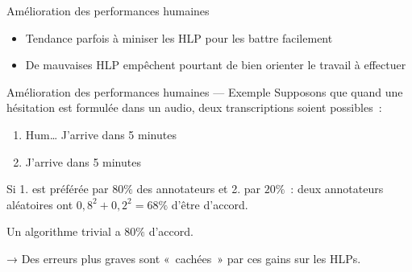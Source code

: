 \begin{frame}{Amélioration des performances humaines}
  \begin{itemize}
    \item Tendance parfois à miniser les HLP pour les battre facilement
    \item De mauvaises HLP empêchent pourtant de bien orienter le travail à effectuer
  \end{itemize}
\end{frame}

\begin{frame}{Amélioration des performances humaines — Exemple}
  Supposons que quand une hésitation est formulée dans un audio, deux transcriptions soient possibles~:
  \begin{enumerate}
    \item Hum… J'arrive dans 5 minutes
    \item J'arrive dans 5 minutes
  \end{enumerate}
  Si 1. est préférée par $80\%$ des annotateurs et 2. par $20\%$~: deux annotateurs aléatoires ont $0,8^2 + 0,2^2 = 68\%$ d'être d'accord.

  Un algorithme trivial a $80\%$ d'accord.

  → Des erreurs plus graves sont « cachées » par ces gains sur les HLPs.
\end{frame}
